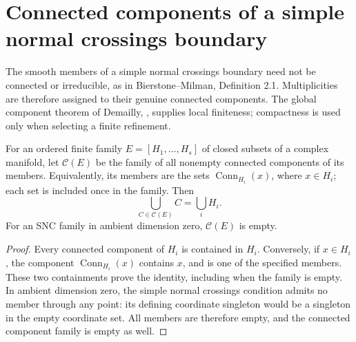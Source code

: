 \section{Connected components of a simple normal crossings boundary}

The smooth members of a simple normal crossings boundary need not be
connected or irreducible, as in Bierstone--Milman\cite{bierstone-milman08-functoriality},
Definition 2.1. Multiplicities are therefore assigned to their genuine connected
components. The global component theorem of Demailly\cite{demailly-cadg},
, supplies local finiteness; compactness is used only when selecting
a finite refinement.

\begin{definition}
\label{hir:connected-boundary-components}
\leanok
For an ordered finite family \(E=[H_1,\ldots,H_s]\) of closed subsets of a
complex manifold, let \(\mathcal C(E)\) be the family of all nonempty connected
components of its members. Equivalently, its members are the sets
\(\operatorname{Conn}_{H_i}(x)\), where \(x\in H_i\); each set is included once
in the family. Then
\[
 \bigcup_{C\in\mathcal C(E)}C=\bigcup_i H_i.
\]
For an SNC family in ambient dimension zero, \(\mathcal C(E)\) is empty.
\end{definition}
\begin{proof}
Every connected component of \(H_i\) is contained in \(H_i\). Conversely,
if \(x\in H_i\), the component \(\operatorname{Conn}_{H_i}(x)\) contains
\(x\), and is one of the specified members. These two containments prove
the identity, including when the family is empty.
In ambient dimension zero, the simple normal crossings condition admits no
member through any point: its defining coordinate singleton would be a
singleton in the empty coordinate set. All members are therefore empty, and
the connected component family is empty as well.
\end{proof}

